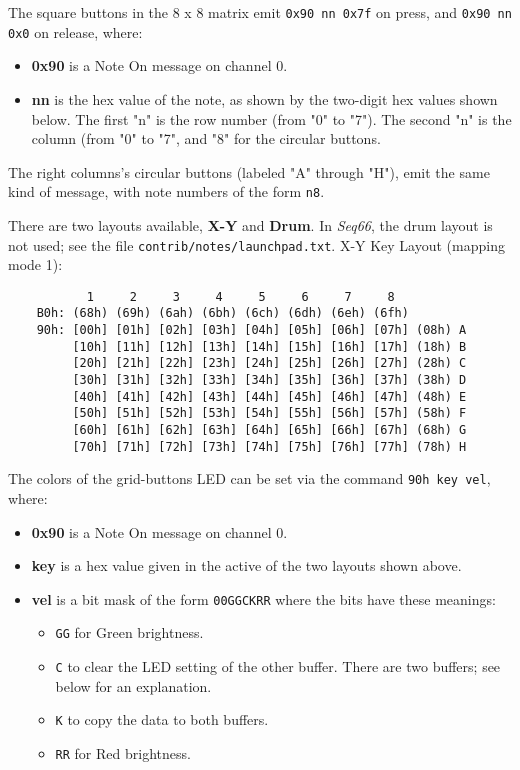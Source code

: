    The square buttons in the 8 x 8 matrix emit
   \texttt{0x90 nn 0x7f} on press, and \texttt{0x90 nn 0x0} on release, where:

   \begin{itemize}
      \item \textbf{0x90}
         is a Note On message on channel 0.
      \item \textbf{nn}
         is the hex value of the note, as shown by the two-digit hex values
            shown below.  The first "n" is the row number (from "0" to "7").
            The second "n" is the column (from "0" to "7", and "8" for the
            circular buttons.
   \end{itemize}

   The right columns's circular buttons (labeled "A" through "H"),
   emit the same kind of message, with note numbers of the form
   \texttt{n8}.

   There are two layouts available, \textbf{X-Y} and \textbf{Drum}.
   In \textsl{Seq66}, the drum layout is not used; see the
   file \texttt{contrib/notes/launchpad.txt}.
   X-Y Key Layout (mapping mode 1):

   \begin{verbatim}
           1     2     3     4     5     6     7     8 
    B0h: (68h) (69h) (6ah) (6bh) (6ch) (6dh) (6eh) (6fh)
    90h: [00h] [01h] [02h] [03h] [04h] [05h] [06h] [07h] (08h) A
         [10h] [11h] [12h] [13h] [14h] [15h] [16h] [17h] (18h) B
         [20h] [21h] [22h] [23h] [24h] [25h] [26h] [27h] (28h) C
         [30h] [31h] [32h] [33h] [34h] [35h] [36h] [37h] (38h) D
         [40h] [41h] [42h] [43h] [44h] [45h] [46h] [47h] (48h) E
         [50h] [51h] [52h] [53h] [54h] [55h] [56h] [57h] (58h) F
         [60h] [61h] [62h] [63h] [64h] [65h] [66h] [67h] (68h) G
         [70h] [71h] [72h] [73h] [74h] [75h] [76h] [77h] (78h) H
   \end{verbatim}

   The colors of the grid-buttons LED can be set via the command
   \texttt{90h key vel}, where:

   \begin{itemize}
      \item \textbf{0x90}
         is a Note On message on channel 0.
      \item \textbf{key} is a hex value given in the active of the
         two layouts shown above.
      \item \textbf{vel} is a bit mask of the form \texttt{00GGCKRR} where the
         bits have these meanings:
         \begin{itemize}
            \item \texttt{GG} for Green brightness.
            \item \texttt{C} to clear the LED setting of the other buffer.
               There are two buffers; see below for an explanation.
            \item \texttt{K} to copy the data to both buffers.
            \item \texttt{RR} for Red brightness.
         \end{itemize}
   \end{itemize}

